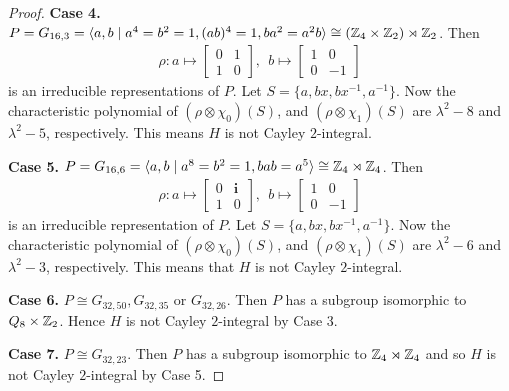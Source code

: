 \documentclass{amsart}
\begin{document}
\begin{proof}
		\textbf{Case 4.} $P=G_{16,3}=\langle a,b\mid a^4=b^2=1, (ab)^4=1, ba^2=a^2b\rangle \cong (\Bbb Z_4\times\Bbb Z_2)\rtimes\Bbb Z_2$. Then 
		\begin{eqnarray*}
			\rho:a\mapsto\begin{bmatrix}
				0&1\\
				1&0
			\end{bmatrix},~~b\mapsto\begin{bmatrix}
				1&0\\
				0&-1
			\end{bmatrix}
		\end{eqnarray*}
		is an irreducible representations of $P$. Let $S=\{a,bx,bx^{-1},a^{-1}\}$. Now the characteristic polynomial of $(\rho\otimes\chi_0)(S)$, and $(\rho\otimes\chi_1)(S)$ are $\lambda^2-8$ and $\lambda^2-5$, respectively. This means $H$ is not Cayley $2$-integral.
		
		\textbf{Case 5.} $P=G_{16,6}=\langle a,b\mid a^8=b^2=1, bab=a^5\rangle\cong \Bbb Z_4\rtimes\Bbb Z_4$. Then 
		\begin{eqnarray*}
			\rho:a\mapsto\begin{bmatrix}
				0&\textbf{i}\\
				1&0
			\end{bmatrix},~~b\mapsto\begin{bmatrix}
			1&0\\
			0&-1
			\end{bmatrix}
		\end{eqnarray*}
		is an irreducible representation of $P$. Let 	$S=\{a,bx,bx^{-1},a^{-1}\}$. Now the characteristic polynomial of $(\rho\otimes\chi_0)(S)$, and $(\rho\otimes\chi_1)(S)$ are $\lambda^2-6$ and $\lambda^2-3$, respectively. This means that $H$ is not Cayley $2$-integral.
	
		
	
		
	
		
		\textbf{Case 6.} $P\cong G_{32,50},G_{32,35}$ or  $G_{32,26}$. Then $P$ has a subgroup isomorphic to $Q_8\times\Bbb Z_2$. Hence  $H$ is not Cayley $2$-integral by Case $3$.
		
		\textbf{Case 7.} $P\cong G_{32,23}$. Then $P$ has a subgroup isomorphic to $\Bbb Z_4\rtimes\Bbb Z_4$ and so $H$ is not Cayley $2$-integral by Case 5.
	\end{proof}
	
\end{document}

